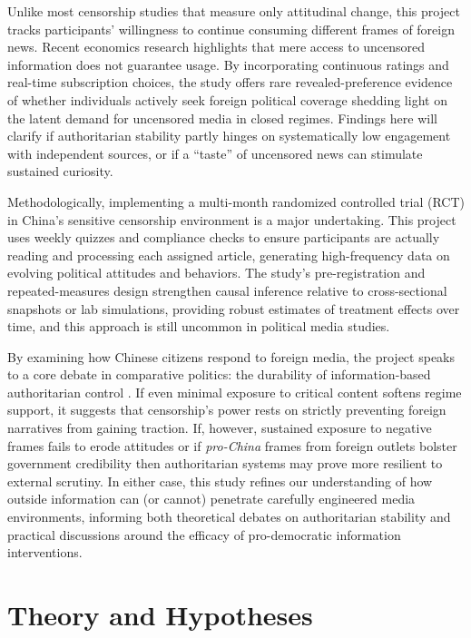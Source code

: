 \documentclass[12pt, american]{article}
\begin{document}
 
   Unlike most censorship studies that measure only attitudinal change, this project tracks participants’ willingness to continue consuming different frames of foreign news. Recent economics research \citep{chen2019impact} highlights that mere access to uncensored information does not guarantee usage. By incorporating continuous ratings and real-time subscription choices, the study offers rare revealed-preference evidence of whether individuals actively seek foreign political coverage shedding light on the latent demand for uncensored media in closed regimes. Findings here will clarify if authoritarian stability partly hinges on systematically low engagement with independent sources, or if a “taste” of uncensored news can stimulate sustained curiosity.

 
   Methodologically, implementing a multi-month randomized controlled trial (RCT) in China’s sensitive censorship environment is a major undertaking. This project uses weekly quizzes and compliance checks to ensure participants are actually reading and processing each assigned article, generating high-frequency data on evolving political attitudes and behaviors. The study’s pre-registration and repeated-measures design strengthen causal inference relative to cross-sectional snapshots or lab simulations, providing robust estimates of treatment effects over time, and this approach is still uncommon in political media studies.


   By examining how Chinese citizens respond to foreign media, the project speaks to a core debate in comparative politics: the durability of information-based authoritarian control \citep{king2013censorship,roberts2018censored}. If even minimal exposure to critical content softens regime support, it suggests that censorship’s power rests on strictly preventing foreign narratives from gaining traction. If, however, sustained exposure to negative frames fails to erode attitudes or if \textit{pro-China} frames from foreign outlets bolster government credibility then authoritarian systems may prove more resilient to external scrutiny. In either case, this study refines our understanding of how outside information can (or cannot) penetrate carefully engineered media environments, informing both theoretical debates on authoritarian stability and practical discussions around the efficacy of pro-democratic information interventions.





\section{Theory and Hypotheses}
\end{document}

